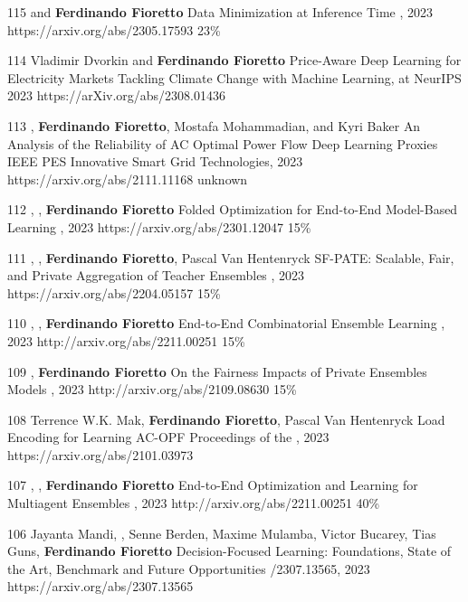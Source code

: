 \begin{pubs}
\confentry
	{115}
	{ and {\bf Ferdinando Fioretto}}
	{Data Minimization at Inference Time}
	{\procNeurIPS, 2023}
	{https://arxiv.org/abs/2305.17593}
	{23\%}

\wsentry
	{114}
 	{Vladimir Dvorkin and {\bf Ferdinando Fioretto}}
  	{Price-Aware Deep Learning for Electricity Markets}
  	{Tackling Climate Change with Machine Learning, at NeurIPS 2023}
  	{https://arXiv.org/abs/2308.01436}

\confentry
	{113}
	{, {\bf Ferdinando Fioretto}, Mostafa Mohammadian, and Kyri Baker}
	{An Analysis of the Reliability of AC Optimal Power Flow Deep Learning Proxies}
	{IEEE PES Innovative Smart Grid Technologies, 2023}
	{https://arxiv.org/abs/2111.11168}
	{unknown}

\confentry 
	{112} %
	{, , {\bf Ferdinando Fioretto}}
	{Folded Optimization for End-to-End Model-Based Learning}
	{\procIJCAI, 2023}
	{https://arxiv.org/abs/2301.12047}
	{15\%}

\confentry
    {111} %
	{, , {\bf Ferdinando Fioretto}, Pascal Van Hentenryck}
	{SF-PATE: Scalable, Fair, and Private Aggregation of Teacher Ensembles}
    {\procIJCAI, 2023}
	{https://arxiv.org/abs/2204.05157}
    {15\%}

\confentry
    {110} %
	{, , {\bf Ferdinando Fioretto}}
	{End-to-End Combinatorial Ensemble Learning}
    {\procIJCAI, 2023}
	{http://arxiv.org/abs/2211.00251}
    {15\%}

\confentry
    {109} %
	{, {\bf Ferdinando Fioretto}}
	{On the Fairness Impacts of Private Ensembles Models}
    {\procIJCAI, 2023}
	{http://arxiv.org/abs/2109.08630}
    {15\%}

\wsentry
	{108} %
	{Terrence W.K. Mak, {\bf Ferdinando Fioretto}, Pascal Van Hentenryck}
	{Load Encoding for Learning AC-OPF}
	{Proceedings of the , 2023}
	{https://arxiv.org/abs/2101.03973}

\confentry
    {107} %
	{, , {\bf Ferdinando Fioretto}}
	{End-to-End Optimization and Learning for Multiagent Ensembles}
    {\procAAMAS, 2023}
	{http://arxiv.org/abs/2211.00251}
    {40\%}

\wsentry
	{106}
	{Jayanta Mandi, , Senne Berden, Maxime Mulamba, Victor Bucarey, Tias Guns, {\bf Ferdinando Fioretto}} 
	{Decision-Focused Learning: Foundations, State of the Art, Benchmark and Future Opportunities}
	{/2307.13565, 2023}
	{https://arxiv.org/abs/2307.13565}


\end{pubs}
